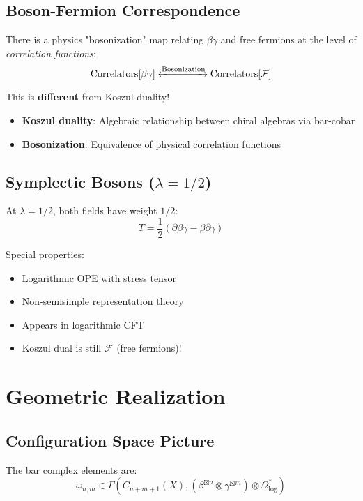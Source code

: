 \subsection{Boson-Fermion Correspondence}

\begin{theorem}
There is a physics "bosonization" map relating $\beta\gamma$ and free fermions at the level of 
\textit{correlation functions}:
$$\text{Correlators}[\beta\gamma] \xleftrightarrow{\text{Bosonization}} \text{Correlators}[\mathcal{F}]$$

This is \textbf{different} from Koszul duality! 
\begin{itemize}
\item \textbf{Koszul duality}: Algebraic relationship between chiral algebras via bar-cobar
\item \textbf{Bosonization}: Equivalence of physical correlation functions
\end{itemize}
\end{theorem}

\subsection{Symplectic Bosons ($\lambda = 1/2$)}

At $\lambda = 1/2$, both fields have weight $1/2$:
$$T = \frac{1}{2}(\partial\beta\gamma - \beta\partial\gamma)$$

Special properties:
\begin{itemize}
\item Logarithmic OPE with stress tensor
\item Non-semisimple representation theory
\item Appears in logarithmic CFT
\item Koszul dual is still $\mathcal{F}$ (free fermions)!
\end{itemize}

\section{Geometric Realization}

\subsection{Configuration Space Picture}

The bar complex elements are:
$$\omega_{n,m} \in \Gamma(C_{n+m+1}(X), (\beta^{\boxtimes n} \otimes \gamma^{\boxtimes m}) \otimes \Omega^*_{\log})$$

